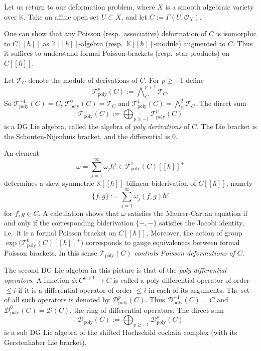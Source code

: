 \documentclass{conm-p-l}
\theoremstyle{definition}
\numberwithin{equation}{section}
\newcommand{\opn}{\operatorname}
\newcommand{\mcal}[1]{\mathcal{#1}}
\newcommand{\mrm}[1]{\mathrm{#1}}
\newcommand{\mbb}[1]{\mathbb{#1}}
\newcommand{\bwedge}{\bigwedge\nolimits}
\newcommand{\K}{\mbb{K}}
\begin{document}
Let us return to our deformation problem, where $X$ is a smooth 
algebraic variety over $\K$. Take an affine open set 
$U \subset X$, and let $C := \Gamma(U, \mcal{O}_X)$. 

One can show that any Poisson (resp.\ associative) deformation of $C$
is isomorphic to $C[[\hbar]]$ as $\K[[\hbar]]$-algebra (resp.\
$\K[[\hbar]]$-module) augmented to $C$. Thus it suffices to understand formal 
Poisson brackets (resp.\ star products) on $C[[\hbar]]$.

Let $\mcal{T}_C$ denote the module of derivations of $C$.  
For $p \geq -1$ define
\[ \mcal{T}^{p}_{\mrm{poly}}(C) := 
\bwedge_C^{p + 1} \mcal{T}_C . \]
So $\mcal{T}^{-1}_{\mrm{poly}}(C) = C$, 
$\mcal{T}^{0}_{\mrm{poly}}(C) = \mcal{T}_C$ and
$\mcal{T}^{1}_{\mrm{poly}}(C) = \bwedge_C^{2} \mcal{T}_C$.
The direct sum
\[ \mcal{T}_{\mrm{poly}}(C) := \bigoplus_{p \geq -1}
\mcal{T}^{p}_{\mrm{poly}}(C) \]
is a DG Lie algebra, called the algebra of {\em poly derivations} 
of $C$. The Lie bracket is the Schouten-Nijenhuis bracket, and the 
differential is $0$.

An element
\[ \omega = \sum_{j = 1}^{\infty} \omega_j \hbar^j
 \in \mcal{T}^{1}_{\mrm{poly}}(C)[[\hbar]]^+ \]
determines a skew-symmetric $\K[[\hbar]]$-bilinear biderivation of $C[[\hbar]]$,
namely  
\begin{equation}
\{ f, g \} := \sum_{j = 1}^{\infty} \omega_j(f, g) \hbar^j 
\end{equation}
for $f, g \in C$. A calculation shows
that $\omega$ satisfies the Maurer-Cartan equation if and only if
the corresponding biderivation $\{ -,- \}$ satisfies the Jacobi identity, i.e.\
it is a formal Poisson bracket on $C[[\hbar]]$.
Moreover, the action of group 
$\opn{exp} \bigl( \mcal{T}^0_{\mrm{poly}}(C)[[\hbar]]^+ \bigr)$
corresponds to gauge equivalences between formal Poisson brackets.
In this sense {\em $\mcal{T}_{\mrm{poly}}(C)$ controls Poisson 
deformations of $C$}. 

The second DG Lie algebra in this picture is that of the 
{\em poly differential operators}. 
A function $\phi : C^{p+1} \to C$ is called a poly differential
operator of order $\leq i$ if it is a differential operator of order $\leq i$ in
each of its arguments. The set of all such operators is denoted by
$\mcal{D}^{p}_{\mrm{poly}}(C)$.
Thus $\mcal{D}^{-1}_{\mrm{poly}}(C) = C$ and
$\mcal{D}^{0}_{\mrm{poly}}(C) = \mcal{D}(C)$, the ring of differential
operators. The direct sum 
\[ \mcal{D}_{\mrm{poly}}(C) := \bigoplus_{p \geq -1}
\mcal{D}^{p}_{\mrm{poly}}(C) \]
is a sub DG Lie algebra of the shifted Hochschild cochain complex
(with its Gerstenhaber Lie bracket). 
\end{document}
